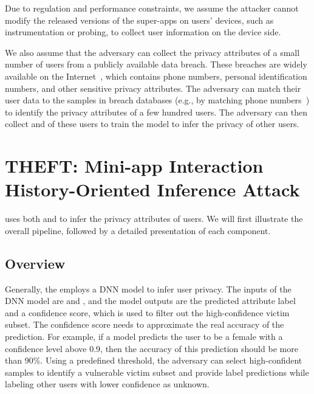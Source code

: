 Due to regulation and performance constraints, we assume the attacker cannot modify the released versions of the super-apps on users' devices, such as instrumentation or probing, to collect user information on the device side.


We also assume that the adversary can collect the privacy attributes of a small number of users from a publicly available data breach. These breaches are widely available on the Internet~\cite{liu2015cloudy,mayer2021now,thomas2017data}, which contains phone numbers, personal identification numbers, and other sensitive privacy attributes. The adversary can match their user data to the samples in breach databases (e.g., by matching phone numbers~\cite{cheng2017enterprise, thomas2017data}) to identify the privacy attributes of a few hundred users. The adversary can then collect \mini and \op of these users to train the model to infer the privacy of other users.

\section{THEFT: Mini-app Interaction History-Oriented Inference Attack}

\tool uses both \mini and \op to infer the privacy attributes of users. We will first illustrate the overall pipeline, followed by a detailed presentation of each component. 





\subsection{Overview}


Generally, the \tool employs a DNN model to infer user privacy. The inputs of the DNN model are \mini and \op, and the model outputs are the predicted attribute label and a confidence score, which is used to filter out the high-confidence victim subset. The confidence score needs to approximate the real accuracy of the prediction. For example, if a model predicts the user to be a female with a confidence level above 0.9, then the accuracy of this prediction should be more than 90\%. Using a predefined threshold, the adversary can select high-confident samples to identify a vulnerable victim subset and provide label predictions while labeling other users with lower confidence as unknown.


